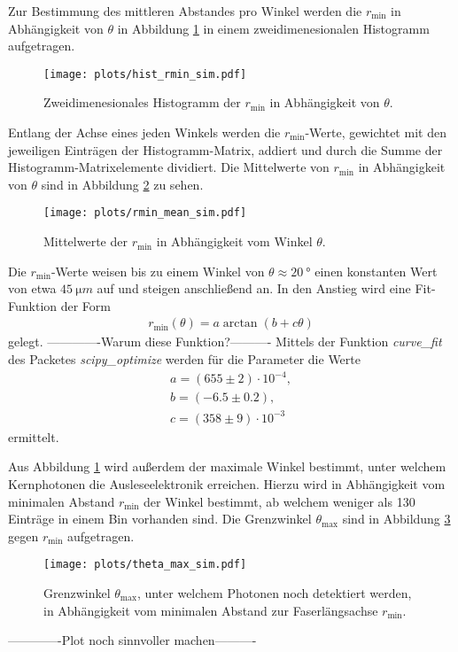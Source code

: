 Zur Bestimmung des mittleren Abstandes pro Winkel werden die $r_\mathrm{min}$ in Abhängigkeit von $\theta$ in Abbildung \ref{fig:Hist_rmin_sim} in einem zweidimenesionalen Histogramm aufgetragen.
\begin{figure}
    \centering
    \texttt{[image: plots/hist\_rmin\_sim.pdf]}
    \caption{Zweidimenesionales Histogramm der $r_\mathrm{min}$ in Abhängigkeit von $\theta$.}
    \label{fig:Hist_rmin_sim}
\end{figure} 
\FloatBarrier
Entlang der Achse eines jeden Winkels werden die $r_\mathrm{min}$-Werte, gewichtet mit den jeweiligen Einträgen der Histogramm-Matrix, addiert und durch die Summe der Histogramm-Matrixelemente dividiert. Die Mittelwerte von $r_\mathrm{min}$ in Abhängigkeit von $\theta$ sind in Abbildung \ref{fig:rmin_mean_sim} zu sehen.
\begin{figure}
    \centering
    \texttt{[image: plots/rmin\_mean\_sim.pdf]}
    \caption{Mittelwerte der $r_\mathrm{min}$ in Abhängigkeit vom Winkel $\theta$. }
    \label{fig:rmin_mean_sim}
\end{figure} 
\FloatBarrier
Die $r_\mathrm{min}$-Werte weisen bis zu einem Winkel von $\theta \approx \SI{20}{°}$ einen konstanten Wert von etwa $\SI{45}{\micro m}$ auf und steigen anschließend an.
In den Anstieg wird eine Fit-Funktion der Form 
\begin{align}
    r_\mathrm{min}(\theta) = a \arctan(b + c \theta)
\end{align}
gelegt. 
-------------Warum diese Funktion?----------
Mittels der Funktion \textit{curve\_fit} des Packetes \textit{scipy\_optimize} werden für die Parameter die Werte 
\begin{align*}
    a = (655 \pm 2)\cdot 10^{-4} ,\\
    b = (-6.5 \pm 0.2),\\
    c = (358 \pm 9)\cdot 10^{-3}
\end{align*}
ermittelt.

Aus Abbildung \ref{fig:Hist_rmin_sim} wird außerdem der maximale Winkel bestimmt, unter welchem Kernphotonen die Ausleseelektronik erreichen. Hierzu wird in Abhängigkeit vom minimalen Abstand $r_\mathrm{min}$ der Winkel bestimmt, ab welchem weniger als 130 Einträge in einem Bin vorhanden sind. Die Grenzwinkel $\theta_\mathrm{max}$ sind in Abbildung \ref{fig:theta_max_sim} gegen $r_\mathrm{min}$ aufgetragen. 
\begin{figure}
    \centering
    \texttt{[image: plots/theta\_max\_sim.pdf]}
    \caption{Grenzwinkel $\theta_\mathrm{max}$, unter welchem Photonen noch detektiert werden, in Abhängigkeit vom minimalen Abstand zur Faserlängsachse $r_\mathrm{min}$. }
    \label{fig:theta_max_sim}
\end{figure} 
\FloatBarrier
-------------Plot noch sinnvoller machen----------\\


